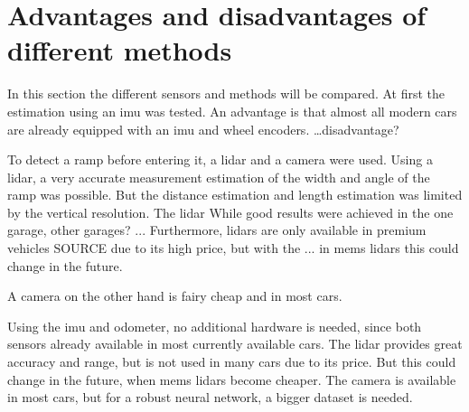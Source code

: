 \section{Advantages and disadvantages of different methods}
In this section the different sensors and methods will be compared.
At first the estimation using an \gls{imu} was tested.
An advantage is that almost all modern cars are already equipped with an \gls{imu} and wheel encoders.
\dots disadvantage?

To detect a ramp before entering it, a \gls{lidar} and a camera were used.
Using a \gls{lidar}, a very accurate measurement estimation of the width and angle of the ramp was possible.
But the distance estimation and length estimation was limited by the vertical resolution.
The \gls{lidar}
While good results were achieved in the one garage, other garages?
...
Furthermore, \glspl{lidar} are only available in premium vehicles SOURCE due to its high price, but with the ... in \gls{mems} \glspl{lidar} this could change in the future.


A camera on the other hand is fairy cheap and in most cars.


Using the \gls{imu} and odometer, no additional hardware is needed, since both sensors already available in most currently available cars.
The \gls{lidar} provides great accuracy and range, but is not used in many cars due to its price.
But this could change in the future, when \gls{mems} \glspl{lidar} become cheaper.
The camera is available in most cars, but for a robust neural network, a bigger dataset is needed.
